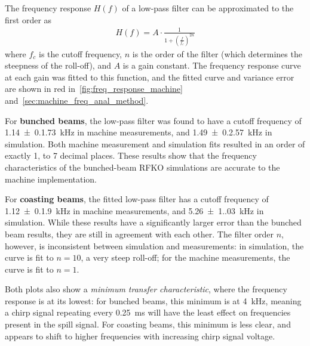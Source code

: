 \documentclass[a4paper,twoside,11pt]{report}
\begin{document}
The frequency response $H(f)$ of a low-pass filter can be approximated to the first order as
\begin{eqnarray}
  H(f) = A\cdot \frac 1{1 + \left( \frac{f}{f_c} \right)^{2n}}
\end{eqnarray}
where $f_c$ is the cutoff frequency, $n$ is the order of the filter (which determines the steepness of the roll-off), and $A$ is a gain constant. The frequency response curve at each gain was fitted to this function, and the fitted curve and variance error are shown in red in~\autoref{fig:freq_response_machine} and~\autoref{sec:machine_freq_anal_method}.

For \textbf{bunched beams}, the low-pass filter was found to have a cutoff frequency of \qty[separate-uncertainty = true]{1.14(0.173)}{\kilo\hertz} in machine measurements, and \qty[separate-uncertainty = true]{1.49(0.257)}{\kilo\hertz} in simulation. Both machine measurement and simulation fits resulted in an order of exactly 1, to 7 decimal places. These results show that the frequency characteristics of the bunched-beam RFKO simulations are accurate to the machine implementation.

For \textbf{coasting beams}, the fitted low-pass filter has a cutoff frequency of \qty[separate-uncertainty = true]{1.12(0.190)}{\kilo\hertz} in machine measurements, and \qty[separate-uncertainty = true]{5.26(1.03)}{\kilo\hertz} in simulation. While these results have a significantly larger error than the bunched beam results, they are still in agreement with each other. The filter order $n$, however, is inconsistent between simulation and measurements: in simulation, the curve is fit to $n=10$, a very steep roll-off; for the machine measurements, the curve is fit to $n=1$.

Both plots also show a \textit{minimum transfer characteristic}, where the frequency response is at its lowest: for bunched beams, this minimum is at \qty{4}{\kilo\hertz}, meaning a chirp signal repeating every \qty{0.25}{\milli\second} will have the least effect on frequencies present in the spill signal. For coasting beams, this minimum is less clear, and appears to shift to higher frequencies with increasing chirp signal voltage.
\end{document}
